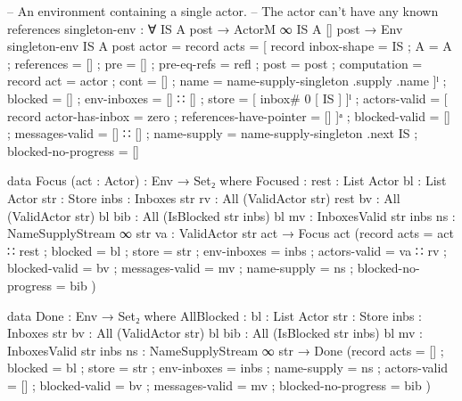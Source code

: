\begin{code}
-- An environment containing a single actor.
-- The actor can't have any known references
singleton-env : ∀ {IS A post} → ActorM ∞ IS A [] post → Env
singleton-env {IS} {A} {post} actor = record
                       { acts = [ record
                                  { inbox-shape = IS
                                  ; A = A
                                  ; references = []
                                  ; pre = []
                                  ; pre-eq-refs = refl
                                  ; post = post
                                  ; computation = record { act = actor ; cont = [] }
                                  ; name = name-supply-singleton .supply .name
                                  } ]ˡ
                       ; blocked = []
                       ; env-inboxes = [] ∷ []
                       ; store = [ inbox# 0 [ IS ] ]ˡ
                       ; actors-valid = [ record { actor-has-inbox = zero ; references-have-pointer = [] }]ᵃ
                       ; blocked-valid = []
                       ; messages-valid =  [] ∷ []
                       ; name-supply = name-supply-singleton .next IS
                       ; blocked-no-progress = []
                       }


data Focus (act : Actor) : Env → Set₂ where
  Focused :
    {rest : List Actor}
    {bl : List Actor}
    {str : Store}
    {inbs : Inboxes str}
    {rv : All (ValidActor str) rest}
    {bv : All (ValidActor str) bl}
    {bib : All (IsBlocked str inbs) bl}
    {mv : InboxesValid str inbs}
    {ns : NameSupplyStream ∞ str}
    {va : ValidActor str act} →
    Focus act (record
      { acts = act ∷ rest
      ; blocked = bl
      ; store = str
      ; env-inboxes = inbs
      ; actors-valid = va ∷ rv
      ; blocked-valid = bv
      ; messages-valid = mv
      ; name-supply = ns
      ; blocked-no-progress = bib
      })

data Done : Env → Set₂ where
  AllBlocked :
    {bl : List Actor}
    {str : Store}
    {inbs : Inboxes str}
    {bv : All (ValidActor str) bl}
    {bib : All (IsBlocked str inbs) bl}
    {mv : InboxesValid str inbs}
    {ns : NameSupplyStream ∞ str} →
    Done (record
            { acts = []
            ; blocked = bl
            ; store = str
            ; env-inboxes = inbs
            ; name-supply = ns
            ; actors-valid = []
            ; blocked-valid = bv
            ; messages-valid = mv
            ; blocked-no-progress = bib
            })

\end{code}

